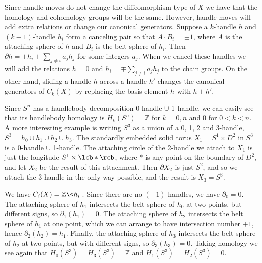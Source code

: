 Since handle moves do not change the diffeomorphism type of $X$ we have that the homology and cohomology groups will be the same. However, handle moves will add extra relations or change our canonical generators. Suppose a $k$-handle $h$ and $(k-1)$-handle $h_i$ form a canceling pair so that $A \cdot B_i = \pm 1$, where $A$ is the attaching sphere of $h$ and $B_i$ is the belt sphere of $h_i$. Then $\partial h = \pm h_i + \sum_{j \neq i} a_j h_j$ for some integers $a_j$. When we cancel these handles we will add the relations $h=0$ and $h_i = \mp \sum_{j \neq i} a_j h_j$ to the chain groups. On the other hand, sliding a handle $h$ across a handle $h'$ changes the canonical generators of $C_k(X)$ by replacing the basis element $h$ with $h \pm h'$.


\begin{example}
Since $S^n$ has a handlebody decomposition 0-handle $\cup$ 1-handle, we can easily see that its handlebody homology is $H_k(S^n)=\mathbb Z$ for $k=0,n$ and $0$ for $0 < k < n$. A more interesting example is writing $S^3$ as a union of a 0, 1, 2 and 3-handle, $S^3 = h_0 \cup h_1 \cup h_2 \cup h_3$. The standardly embedded solid torus $X_1 = S^1 \times D^2$ in $S^3$ is a 0-handle $\cup$ 1-handle. The attaching circle of the 2-handle we attach to $X_1$ is just the longitude $S^1 \times \lcb * \rcb$, where $*$ is any point on the boundary of $D^2$, and let $X_2$ be the result of this attachment. Then $\partial X_2$ is just $S^2$, and so we attach the 3-handle in the only way possible, and the result is $X_3 = S^3$.

We have $C_i(X) = \mathbb Z\< h_i \>$. Since there are no $(-1)$-handles, we have $\partial_0 = 0$. The attaching sphere of $h_1$ intersects the belt sphere of $h_0$ at two points, but different signs, so $\partial_1(h_1) = 0$. The attaching sphere of $h_2$ intersects the belt sphere of $h_1$ at one point, which we can arrange to have intersection number $+1$, hence $\partial_2(h_2)=h_1$. Finally, the attaching sphere of $h_3$ intersects the belt sphere of $h_2$ at two points, but with different signs, so $\partial_3(h_3) = 0$. Taking homology we see again that $H_0(S^3)=H_3(S^3)=\mathbb Z$ and $H_1(S^3)=H_2(S^3)=0$. 
\end{example}



